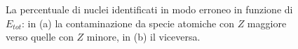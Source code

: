 \begin{figure}[!p] 
	\centering
	\hspace{10mm}
	\caption{La percentuale di nuclei identificati in modo erroneo in funzione di $E_{tot}$: in (a) la contaminazione da specie atomiche con $Z$ maggiore verso quelle con $Z$ minore, in (b) il viceversa.} \label{fig:leakage}
\end{figure}


